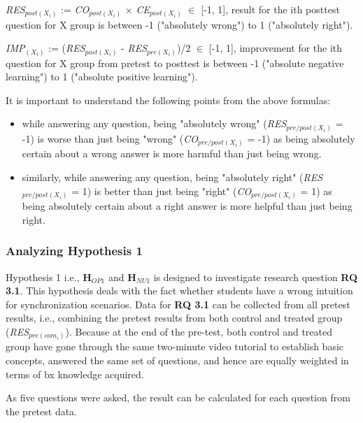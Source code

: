 \textit{RES$_{post(X_i)}$} := \textit{CO$_{post(X_i)}$} $\times$ \textit{CE$_{post(X_i)}$} $\in$ [-1,  1], result for the ith posttest question for X group is between -1 ("absolutely wrong") to 1 ("absolutely right").

\textit{IMP$_{(X_i)}$} := (\textit{RES$_{post(X_i)}$} - \textit{RES$_{pre(X_i)}$})/2 $\in$ [-1,  1], improvement for the ith question for X group from pretest to posttest is between -1 ("absolute negative learning") to 1 ("absolute positive learning").

It is important to understand the following points from the above formulas:
\begin{itemize}
	\item while answering any question, being "absolutely wrong" (\textit{RES$_{pre/post(X_i)}$} = -1) is worse than just being "wrong" (\textit{CO$_{pre/post(X_i)}$} = -1) as being absolutely certain about a wrong answer is more harmful than just being wrong.
	\item similarly, while answering any question, being "absolutely right" (\textit{RES$_{pre/post(X_i)}$} = 1) is better than just being "right" (\textit{CO$_{pre/post(X_i)}$} = 1) as being absolutely certain about a right answer is more helpful than just being right.
\end{itemize} 

\subsubsection{Analyzing Hypothesis 1}\label{subsubsec:hypothesis1}
Hypothesis 1 i.e., \textbf{H$_{OP1}$} and \textbf{H$_{NU1}$} is designed to investigate research question \textbf{RQ 3.1}. This hypothesis deals with the fact whether students have a wrong intuition for synchronization scenarios. Data for \textbf{RQ 3.1} can be collected from all pretest results, i.e., combining the pretest results from both control and treated group (\textit{RES$_{pre(com_i)}$}). Because at the end of the pre-test, both control and treated group have gone through the same two-minute video tutorial to establish basic concepts, answered the same set of questions, and hence are equally weighted in terms of bx knowledge acquired.

As five questions were asked, the result can be calculated for each question from the pretest data. 

